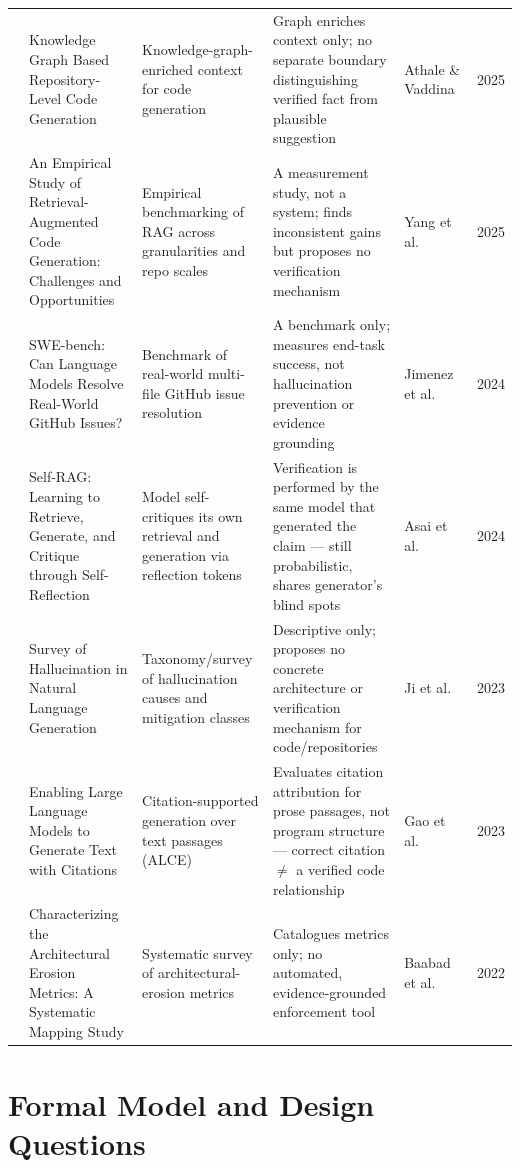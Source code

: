 \documentclass[runningheads]{llncs}
\begin{document}
\begin{table}[t]
\begin{tabular}{cp{4.5cm}p{3.5cm}p{4cm}p{2.5cm}c}
\addlinespace
5 & Knowledge Graph Based Repository-Level Code Generation & Knowledge-graph-enriched context for code generation & Graph enriches context only; no separate boundary distinguishing verified fact from plausible suggestion & Athale \& Vaddina~\cite{athale2025knowledge} & 2025 \\
\addlinespace
6 & An Empirical Study of Retrieval-Augmented Code Generation: Challenges and Opportunities & Empirical benchmarking of RAG across granularities and repo scales & A measurement study, not a system; finds inconsistent gains but proposes no verification mechanism & Yang et al.~\cite{yang2025empirical} & 2025 \\
\addlinespace
7 & SWE-bench: Can Language Models Resolve Real-World GitHub Issues? & Benchmark of real-world multi-file GitHub issue resolution & A benchmark only; measures end-task success, not hallucination prevention or evidence grounding & Jimenez et al.~\cite{jimenez2024swebench} & 2024 \\
\addlinespace
8 & Self-RAG: Learning to Retrieve, Generate, and Critique through Self-Reflection & Model self-critiques its own retrieval and generation via reflection tokens & Verification is performed by the same model that generated the claim --- still probabilistic, shares generator's blind spots & Asai et al.~\cite{asai2024selfrag} & 2024 \\
\addlinespace
9 & Survey of Hallucination in Natural Language Generation & Taxonomy/survey of hallucination causes and mitigation classes & Descriptive only; proposes no concrete architecture or verification mechanism for code/repositories & Ji et al.~\cite{ji2023survey} & 2023 \\
\addlinespace
10 & Enabling Large Language Models to Generate Text with Citations & Citation-supported generation over text passages (ALCE) & Evaluates citation attribution for prose passages, not program structure --- correct citation $\neq$ a verified code relationship & Gao et al.~\cite{gao2023alce} & 2023 \\
\addlinespace
11 & Characterizing the Architectural Erosion Metrics: A Systematic Mapping Study & Systematic survey of architectural-erosion metrics & Catalogues metrics only; no automated, evidence-grounded enforcement tool & Baabad et al.~\cite{baabad2022erosion} & 2022 \\
\bottomrule
\end{tabular}
\end{table}

\section{Formal Model and Design Questions}
\end{document}
